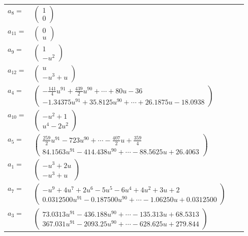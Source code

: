 \documentclass[1p]{elsarticle_modified}
\theoremstyle{definition}
\begin{document}
\begin{tabular}{m{7pt} m{180pt} m{7pt} m{180pt} }
\flushright $a_{8}=$&$\begin{pmatrix}1\\0\end{pmatrix}$ \\
\flushright $a_{11}=$&$\begin{pmatrix}0\\u\end{pmatrix}$ \\
\flushright $a_{9}=$&$\begin{pmatrix}1\\- u^2\end{pmatrix}$ \\
\flushright $a_{12}=$&$\begin{pmatrix}u\\- u^3+u\end{pmatrix}$ \\
\flushright $a_{4}=$&$\begin{pmatrix}-\frac{141}{4} u^{91}+\frac{439}{2} u^{90}+\cdots+80 u-36\\-1.34375 u^{91}+35.8125 u^{90}+\cdots+26.1875 u-18.0938\end{pmatrix}$ \\
\flushright $a_{10}=$&$\begin{pmatrix}- u^2+1\\u^4-2 u^2\end{pmatrix}$ \\
\flushright $a_{5}=$&$\begin{pmatrix}\frac{259}{2} u^{91}-723 u^{90}+\cdots-\frac{407}{2} u+\frac{359}{4}\\84.1563 u^{91}-414.438 u^{90}+\cdots-88.5625 u+26.4063\end{pmatrix}$ \\
\flushright $a_{1}=$&$\begin{pmatrix}- u^3+2 u\\- u^3+u\end{pmatrix}$ \\
\flushright $a_{7}=$&$\begin{pmatrix}- u^9+4 u^7+2 u^6-5 u^5-6 u^4+4 u^2+3 u+2\\0.0312500 u^{91}-0.187500 u^{90}+\cdots-1.06250 u+0.0312500\end{pmatrix}$ \\
\flushright $a_{3}=$&$\begin{pmatrix}73.0313 u^{91}-436.188 u^{90}+\cdots-135.313 u+68.5313\\367.031 u^{91}-2093.25 u^{90}+\cdots-628.625 u+279.844\end{pmatrix}$ \\

\end{tabular}
\end{document}
